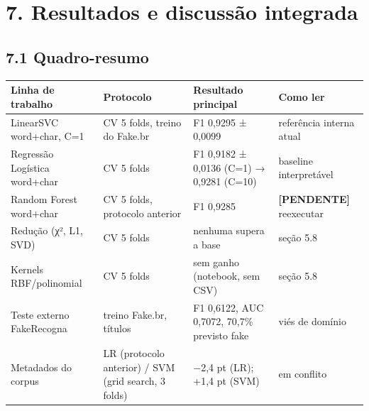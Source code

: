 \documentclass[
  brazilian,
  11pt,
]{article}
\newcounter{none} %
\begin{document}
\section{7. Resultados e discussão integrada}\label{resultados-e-discussuxe3o-integrada}

\subsection{7.1 Quadro-resumo}\label{quadro-resumo}

{\def\LTcaptype{none} %
\begin{longtable}[]{@{}
  >{\raggedright\arraybackslash}p{}
  >{\raggedright\arraybackslash}p{}
  >{\raggedright\arraybackslash}p{}
  >{\raggedright\arraybackslash}p{}@{}}
\toprule\noalign{}
\begin{minipage}[b]{\linewidth}\raggedright
Linha de trabalho
\end{minipage} & \begin{minipage}[b]{\linewidth}\raggedright
Protocolo
\end{minipage} & \begin{minipage}[b]{\linewidth}\raggedright
Resultado principal
\end{minipage} & \begin{minipage}[b]{\linewidth}\raggedright
Como ler
\end{minipage} \\
\midrule\noalign{}
\endhead
\bottomrule\noalign{}
\endlastfoot
LinearSVC word+char, C=1 & CV 5 folds, treino do Fake.br & F1 0,9295 ± 0,0099 & referência interna atual \\
Regressão Logística word+char & CV 5 folds & F1 0,9182 ± 0,0136 (C=1) → 0,9281 (C=10) & baseline interpretável \\
Random Forest word+char & CV 5 folds, protocolo anterior & F1 0,9285 & \textbf{{[}PENDENTE{]}} reexecutar \\
Redução (χ², L1, SVD) & CV 5 folds & nenhuma supera a base & seção 5.8 \\
Kernels RBF/polinomial & CV 5 folds & sem ganho (notebook, sem CSV) & seção 5.8 \\
Teste externo FakeRecogna & treino Fake.br, títulos & F1 0,6122, AUC 0,7072, 70,7\% previsto fake & viés de domínio \\
Metadados do corpus & LR (protocolo anterior) / SVM (grid search, 3 folds) & −2,4 pt (LR); +1,4 pt (SVM) & em conflito \\

\end{longtable}}
\end{document}
